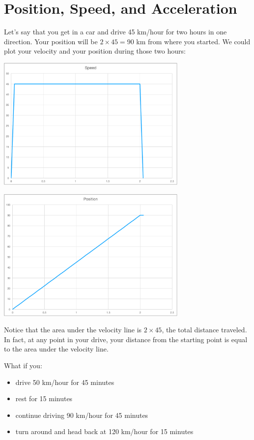 \chapter{Position, Speed, and Acceleration}

Let's say that you get in a car and drive 45 km/hour for two hours in
one direction. Your position will be $2 \times 45 = 90$ km from where
you started. We could plot your velocity and your position during those two hours:

\includegraphics[width=0.7\textwidth]{speed_simple.pdf}

\includegraphics[width=0.7\textwidth]{position_simple.pdf}

Notice that the area under the velocity line is $2 \times 45$, the total
distance traveled. In fact, at any point in your drive, your distance
from the starting point is equal to the area under the velocity line.

What if you:
\begin{itemize}
\item drive 50 km/hour for 45 minutes
\item rest for 15 minutes
\item continue driving 90 km/hour for 45 minutes
\item turn around and head back at 120 km/hour for 15 minutes
\end{itemize}

